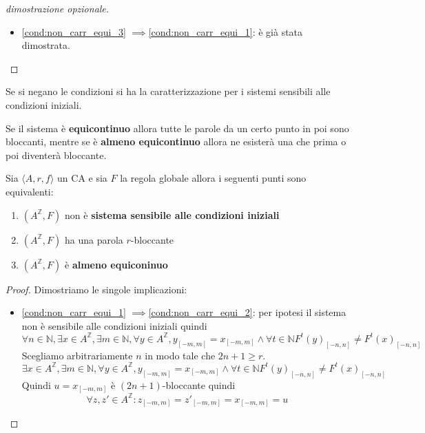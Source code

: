 \begin{teorema}
\begin{proof}[dimostrazione opzionale]
\begin{itemize}
            \item \ref{cond:non_carr_equi_3} $\implies $\ref{cond:non_carr_equi_1}: 
            è già stata dimostrata.
        \end{itemize}
    \end{proof}
\end{teorema}
Se si negano le condizioni si ha la caratterizzazione per i sistemi sensibili
alle condizioni iniziali.

\begin{nota}
    Se il sistema è \textbf{equicontinuo} allora tutte le parole da un certo punto 
    in poi sono bloccanti, mentre se è \textbf{almeno equicontinuo} allora ne esisterà
    una che prima o poi diventerà bloccante.
\end{nota}

\begin{teorema}
    Sia $\langle A,r,f\rangle$ un CA e sia $F$ la regola globale allora i seguenti
    punti sono equivalenti:
    \begin{enumerate}
        \item \label{cond:non_carr_a_equi_1} $(A^\mathbb{Z}, F)$ non è \textbf{sistema 
        sensibile alle condizioni iniziali}
        \item \label{cond:non_carr_a_equi_2} $(A^\mathbb{Z}, F)$ ha una parola $r$-bloccante
        \item \label{cond:non_carr_a_equi_3} $(A^\mathbb{Z}, F)$ è \textbf{almeno equiconinuo}
    \end{enumerate}
    \begin{proof}
        Dimostriamo le singole implicazioni:
        \begin{itemize}
            \item \ref{cond:non_carr_equi_1} $\implies $\ref{cond:non_carr_equi_2}:
            per ipotesi il sistema non è sensibile alle condizioni iniziali quindi
            $$\forall n\in \mathbb{N} ,\exists x \in A^\mathbb{Z}, \exists m\in \mathbb{N} , \forall y\in A^\mathbb{Z}, y_{[-m,m]} = x_{[-m,m]} \land \forall t\in \mathbb{N} F^t(y)_{[-n,n]}\ne F^t(x)_{[-n,n]}$$
            Scegliamo arbitrariamente $n$ in modo tale che $2n+1\ge r$.
            $$\exists x \in A^\mathbb{Z}, \exists m\in \mathbb{N} , \forall y\in A^\mathbb{Z}, y_{[-m,m]} = x_{[-m,m]} \land \forall t\in \mathbb{N} F^t(y)_{[-n,n]}\ne F^t(x)_{[-n,n]}$$
            Quindi $u=x_{[-m,m]}$ è $(2n+1)$-bloccante quindi
            $$\forall z,z'\in A^\mathbb{Z}: z_{[-m,m]}=z'_{[-m,m]} = x_{[-m,m]} =u$$

\end{itemize}
\end{proof}
\end{teorema}
